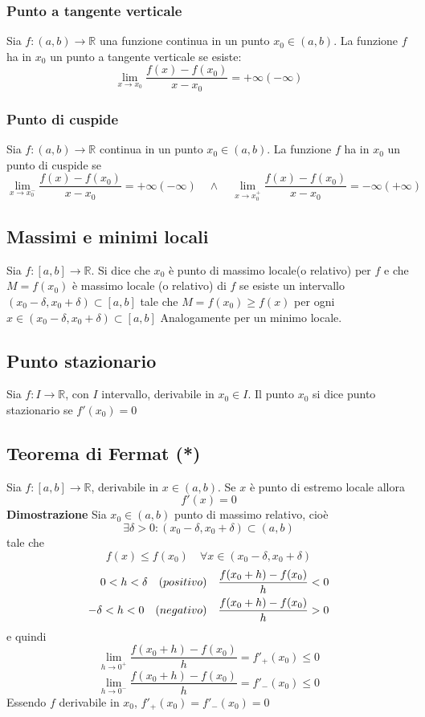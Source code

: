 \documentclass[12pt]{article}
\begin{document}
\subsubsection{Punto a tangente verticale}
Sia $f: (a,b) \to \mathbb{R}$ una funzione continua in un punto $x_0 \in (a,b)$. La funzione $f$ ha in $x_0$ un punto a tangente verticale se esiste:
\[ \lim_{x \to x_0} \frac{f(x) - f(x_0)}{x - x_0} = +\infty(-\infty) \]

\subsubsection{Punto di cuspide}
Sia $f: (a,b) \to \mathbb{R}$ continua in un punto $x_0 \in (a,b)$. La funzione $f$ ha in $x_0$
un punto di cuspide se
\[ \lim_{x \to x_{0}^{-}} \frac{f(x) - f(x_0)}{x - x_0} = +\infty(-\infty)
\quad \wedge \quad
\lim_{x \to x_{0}^{+}} \frac{f(x) - f(x_0)}{x - x_0} = -\infty(+\infty)\]

\subsection{Massimi e minimi locali}
Sia $f: [a,b] \to \mathbb{R}$. Si dice che $x_0$
è punto di massimo locale(o relativo) per $f$ e che
$M = f(x_0)$ è massimo locale (o relativo) di $f$ se
esiste un intervallo $(x_0 - \delta, x_0 + \delta) \subset [a,b]$
tale che $M = f(x_0) \geq f(x)$
per ogni $x \in (x_0 - \delta, x_0 + \delta) \subset [a,b]$
Analogamente per un minimo locale.

\subsection{Punto stazionario}
Sia $f: I \to \mathbb{R}$, con $I$ intervallo, derivabile in $x_0 \in I$.
Il punto $x_0$ si dice punto stazionario se $f'(x_0) = 0$

\subsection{Teorema di Fermat (*)}
Sia $f: [a,b] \to \mathbb{R}$, derivabile in $x \in (a,b)$.
Se $x$ è punto di estremo locale allora
\[f'(x) = 0\]
\textbf{Dimostrazione}\newline
Sia $x_0 \in (a,b)$ punto di massimo relativo, cioè
\[
\exists \delta > 0: (x_0 - \delta, x_0 + \delta) \subset (a,b)
\]
tale che
\[
f(x) \leq f(x_0)\quad \forall x \in (x_0 - \delta, x_0 + \delta)
\]
\[ \begin{aligned} 
\quad 0 < h < \delta \text \quad {(positivo)} \quad \frac{f(x_0 +h) - f(x_0)}{h}<0 \\ 
 -\delta <h<0 \text \quad {(negativo)} \quad \frac{f(x_0 +h) - f(x_0)}{h}>0 
\end{aligned} \] 
e quindi
\[ 
\lim_{h \to 0^+} \frac{f(x_0 +h) - f(x_0)}{h} = f'_{+}(x_0) \leq 0 
\]
\[ 
\lim_{h \to 0^-} \frac{f(x_0 +h) - f(x_0)}{h} = f'_{-}(x_0) \leq 0 
\]
Essendo $f$ derivabile in $x_0$, $f'_{+}(x_0) = f'_{-}(x_0) = 0$
\end{document}
